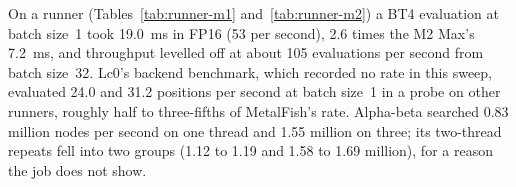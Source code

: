 \documentclass{article}
\newcommand{\MF}{MetalFish}
\begin{document}
On a runner (Tables~\ref{tab:runner-m1} and~\ref{tab:runner-m2}) a BT4 evaluation at batch size~1 took 19.0~ms in FP16 (53 per second), 2.6 times the M2 Max's 7.2~ms, and throughput levelled off at about 105 evaluations per second from batch size~32. Lc0's backend benchmark, which recorded no rate in this sweep, evaluated 24.0 and 31.2 positions per second at batch size~1 in a probe on other runners, roughly half to three-fifths of \MF{}'s rate. Alpha-beta searched 0.83
million nodes per second on one thread and 1.55 million on three; its two-thread repeats fell into two groups (1.12 to 1.19 and 1.58 to 1.69 million), for a reason the job does not show.

\end{document}
